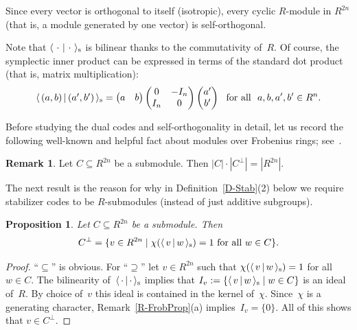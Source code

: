 \documentclass[11pt]{article}
\newtheorem{prop}[theo]{Proposition}
\theoremstyle{definition}
\newtheorem{rem}[theo]{Remark}
\numberwithin{equation}{section}
\newcommand{\inners}[2]{\mbox{$\langle{\,{#1}\,}|\,{#2}\,\rangle_{\rm s}$}}
\newcounter{ara}
\begin{document}
Since  every vector is orthogonal to itself (isotropic), every cyclic $R$-module in $R^{2n}$ (that is, a module generated by one vector) is self-orthogonal.

Note that $\inners{\,\cdot\,}{\,\cdot\,}$ is bilinear thanks to the commutativity of~$R$.
Of course, the symplectic inner product can be expressed in terms of the standard dot product (that is, matrix multiplication):
\begin{equation}\label{e-sympldot}
  \inners{(a,b)}{(a',b')}=\begin{pmatrix}a&b\end{pmatrix}\begin{pmatrix}0&-I_n\\ I_n&0\end{pmatrix}\begin{pmatrix}a'\\b'\end{pmatrix}
  \ \text{ for all }\ a,b,a',b'\in R^n.
\end{equation}

Before studying the dual codes and self-orthogonality in detail, let us record the following well-known and helpful fact about modules over Frobenius rings; see~\cite[Cor.~5]{HoLa01}.

\begin{rem}\label{R-CCperpCard}
Let $C\subseteq R^{2n}$ be a submodule. Then $|C|\!\cdot\!|C^\perp|=|R^{2n}|$.
\end{rem}

The next result is the reason for why in Definition~\ref{D-Stab}(2) below we require stabilizer codes to be $R$-submodules (instead of just additive subgroups).

\begin{prop}\label{P-ChiInner}
Let $C\subseteq R^{2n}$ be a submodule. Then
\[
  C^{\perp}=\{v\in R^{2n}\mid \chi(\inners{v}{w})=1\text{ for all }w\in C\}.
\]
\end{prop}

\begin{proof}
``$\subseteq$'' is obvious.
For ``$\supseteq$'' let $v\in R^{2n}$ such that $\chi(\inners{v}{w})=1$ for all $w\in C$.
The bilinearity of~$\inners{\cdot}{\cdot}$ implies that
$I_v:=\{\inners{v}{w}\mid w\in C\}$ is an ideal of~$R$.
By choice of~$v$ this ideal is contained in the kernel of~$\chi$.
Since~$\chi$ is a generating character, Remark~\ref{R-FrobProp}(a) implies~$I_v=\{0\}$.
All of this shows that $v\in C^\perp$.
\end{proof}
\end{document}
